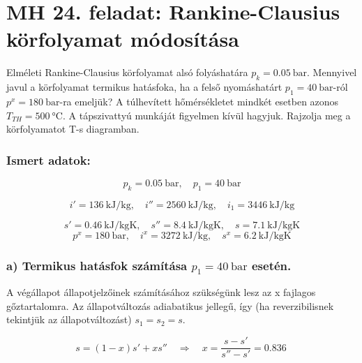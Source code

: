 
\section*{MH 24. feladat: Rankine-Clausius körfolyamat módosítása}

Elméleti Rankine-Clausius körfolyamat alsó folyáshatára $p_k = \SI{0,05}{\bar}$. Mennyivel javul a körfolyamat termikus hatásfoka, ha a felső nyomáshatárt $p_1 = \SI{40}{\bar}$-ról $p^x = \SI{180}{\bar}$-ra emeljük? A túlhevített hőmérsékletet mindkét esetben azonos $T_{TH} = \SI{500}{\celsius}$. A tápszivattyú munkáját figyelmen kívül hagyjuk. Rajzolja meg a körfolyamatot T-s diagramban.

\subsubsection{Ismert adatok:}

\begin{equation*}
	p_k = \SI{0,05}{\bar},
	\quad
	p_1 = \SI{40}{\bar}	
\end{equation*}

\begin{equation*}
	i' = \SI{136}{\kilo\joule\per\kilogram},
	\quad
	i'' = \SI{2560}{\kilo\joule\per\kilogram},
	\quad
	i_1 = \SI{3446}{\kilo\joule\per\kilogram}
\end{equation*}

\begin{equation*}
	s' = \SI{0,46}{\kilo\joule\per\kilogram\kelvin},
	\quad
	s'' = \SI{8,4}{\kilo\joule\per\kilogram\kelvin},
	\quad
	s = \SI{7,1}{\kilo\joule\per\kilogram\kelvin}
\end{equation*}
\begin{equation*}
	p^x = \SI{180}{\bar},
	\quad
	i^x = \SI{3272}{\kilo\joule\per\kilogram},
	\quad
	s^x = \SI{6,2}{\kilo\joule\per\kilogram\kelvin}
\end{equation*}


\subsubsection*{a) Termikus hatásfok számítása $p_1=\SI{40}{\bar}$ esetén.}

A végállapot állapotjelzőinek számításához szükségünk lesz az x fajlagos gőztartalomra. Az állapotváltozás adiabatikus jellegű, így (ha reverzibilisnek tekintjük az állapotváltozást) $s_1 = s_2 = s $.

\begin{equation}
	s = \left(1 - x\right) s' + x s''
	\quad 
	\Rightarrow
	\quad 
	x =	\dfrac{s - s'}{s'' - s'} = \SI{0,836}{}
\end{equation}


